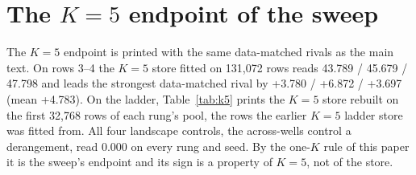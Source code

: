 \documentclass{article} %
\begin{document}
\section{The $K=5$ endpoint of the sweep}
\label{app:k5}
The $K=5$ endpoint is printed with the same data-matched rivals as the main text. On rows 3--4 the
$K=5$ store fitted on 131,072 rows reads 43.789 / 45.679 / 47.798 and leads the strongest data-matched %
rival by +3.780 / +6.872 / +3.697 (mean +4.783). On the ladder, Table~\ref{tab:k5} prints the $K=5$ %
store rebuilt on the first 32,768 rows of each rung's pool, the rows the earlier $K=5$ ladder store %
was fitted from. All four landscape controls, the across-wells control a derangement, read 0.000 on
every rung and seed. By the one-$K$ rule of this paper it is the sweep's endpoint and its sign is a %
property of $K=5$, not of the store.
\end{document}
